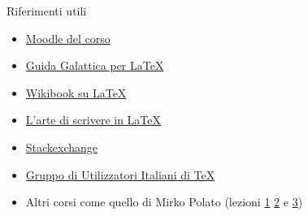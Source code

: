 \begin{frame}{Riferimenti utili}
	\begin{itemize}
	  \item {\href{https://elearning.unipd.it/math/course/view.php?id=252}{Moodle del corso}}
		\item {\href{https://github.com/R-and-LaTeX/GuidaGalatticaPerLaTeX/releases/download/v0.1.0/GuidaGalatticaPerLaTeX.pdf}
		{Guida Galattica per \LaTeX{}}}
		\item {\href{https://en.wikibooks.org/wiki/LaTeX/}{Wikibook su LaTeX}}
		\item {\href{http://www.lorenzopantieri.net/LaTeX_files/ArteLaTeX.pdf}
		{L'arte di scrivere in LaTeX}}
		\item {\href{https://tex.stackexchange.com/}{Stackexchange}}
		\item {\href{http://www.guitex.org/}
		{Gruppo di Utilizzatori Italiani di TeX}}
		\item Altri corsi come quello di Mirko Polato (lezioni
		{\href{http://www.math.unipd.it/~mpolato/didattica/latex/lesson_1.pdf}
		{1}}
		{\href{http://www.math.unipd.it/~mpolato/didattica/latex/lesson_2.pdf}
		{2}}
		 e 
		{\href{http://www.math.unipd.it/~mpolato/didattica/latex/lesson_3.pdf}
		{3}})
	\end{itemize}
\end{frame}